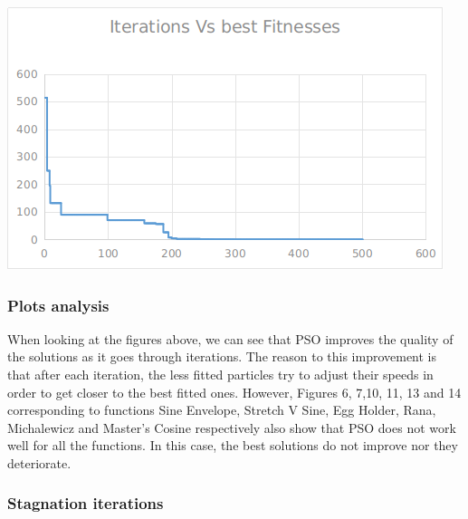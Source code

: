 \documentclass[12pt]{article}
\begin{document}
				\hfill
				\begin{minipage}{0.6\linewidth}
					\includegraphics[width=\linewidth]{18.png}
				\end{minipage}
				\subsubsection{Plots analysis}
					When looking at the figures above, we can see that PSO improves the quality of the solutions as it goes through iterations. The reason to this improvement is that after each iteration, the less fitted particles try to adjust their speeds in order to get closer to the best fitted ones. However, Figures 6, 7,10, 11, 13 and 14 corresponding to functions Sine Envelope, Stretch V Sine, Egg Holder, Rana, Michalewicz and Master's Cosine respectively also show that PSO does not work well for all the functions. In this case, the best solutions do not improve nor they deteriorate. 
				\subsubsection{Stagnation iterations}
	
\end{document}
